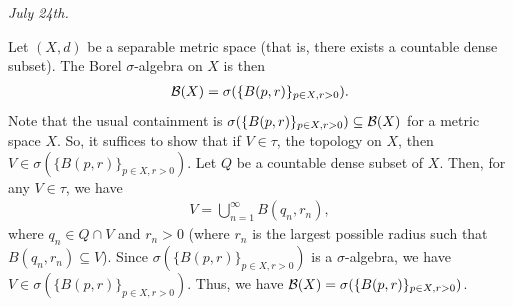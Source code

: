 \textit{July 24th.}
\begin{example}
    Let $(X,d)$ be a separable metric space (that is, there exists a countable dense subset). The Borel $\sigma$-algebra on $X$ is then
    \begin{align}
        \mathcal{B}(X) = \sigma(\{B(p,r)\}_{p \in X, r >0}).
    \end{align}
    Note that the usual containment is $\sigma(\{B(p,r)\}_{p \in X, r >0}) \subseteq \mathcal{B}(X)$ for a metric space $X$. So, it suffices to show that if $V \in \tau$, the topology on $X$, then $V \in \sigma(\{B(p,r)\}_{p \in X, r >0})$. Let $Q$ be a countable dense subset of $X$. Then, for any $V \in \tau$, we have
    \begin{align}
        V = \bigcup_{n=1}^{\infty} B(q_{n},r_{n}),
    \end{align}
    where $q_{n} \in Q \cap V$ and $r_{n} > 0$ (where $r_{n}$ is the largest possible radius such that $B(q_{n},r_{n}) \subseteq V$). Since $\sigma(\{B(p,r)\}_{p \in X, r >0})$ is a $\sigma$-algebra, we have $V \in \sigma(\{B(p,r)\}_{p \in X, r >0})$. Thus, we have $\mathcal{B}(X) = \sigma(\{B(p,r)\}_{p \in X, r >0})$.
\end{example}

